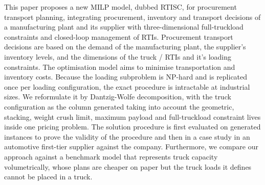 
This paper proposes a new \ac{MILP} model, dubbed \ac{RTISC}, for procurement transport planning, integrating procurement, inventory and transport decisions of a manufacturing plant and its supplier with three-dimensional full-truckload constraints and closed-loop management of \acp{RTI}.
Procurement transport decisions are based on the demand of the manufacturing plant, the supplier’s inventory levels, and the dimensions of the truck / \acp{RTI} and it's loading constraints.
The optimisation model aims to minimise transportation and inventory costs.
Because the loading subproblem is NP-hard and is replicated once per loading configuration, the exact procedure is intractable at industrial sizes.
We reformulate it by Dantzig-Wolfe decomposition, with the truck configuration as the column generated taking into account the geometric, stacking, weight crush limit, maximum payload and full-truckload constraint lives inside one pricing problem.
The solution procedure is first evaluated on generated instances to prove the validity of the procedure and then in a case study in an automotive first-tier supplier against the company.
Furthermore, we compare our approach against a benchmark model that represents truck capacity volumetrically, whose plans are cheaper on paper but the truck loads it defines cannot be placed in a truck.

